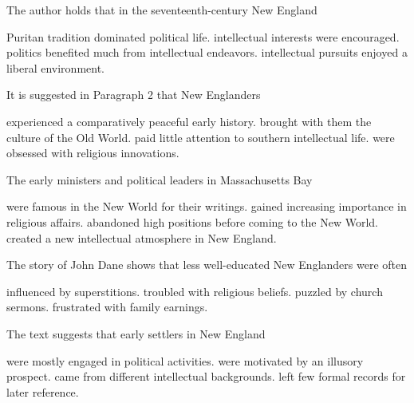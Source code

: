 \item The author holds that in the seventeenth-century New England
\begin{tasks}
	\task Puritan tradition dominated political life.
	\task intellectual interests were encouraged.
	\task politics benefited much from intellectual endeavors.
	\task intellectual pursuits enjoyed a liberal environment.
\end{tasks}
\item It is suggested in Paragraph 2 that New Englanders
\begin{tasks}
	\task experienced a comparatively peaceful early history.
	\task brought with them the culture of the Old World.
	\task paid little attention to southern intellectual life.
	\task were obsessed with religious innovations.
\end{tasks}
\item The early ministers and political leaders in Massachusetts Bay
\begin{tasks}
	\task were famous in the New World for their writings.
	\task gained increasing importance in religious affairs.
	\task abandoned high positions before coming to the New World.
	\task created a new intellectual atmosphere in New England.
\end{tasks}
\item The story of John Dane shows that less well-educated New Englanders were  often
\begin{tasks}
	\task influenced by superstitions.
	\task troubled with religious beliefs.
	\task puzzled by church sermons.
	\task frustrated with family earnings.
\end{tasks}
\item The text suggests that early settlers in New England
\begin{tasks}
	\task were mostly engaged in political activities.
	\task were motivated by an illusory prospect.
	\task came from different intellectual backgrounds.
	\task left few formal records for later reference.
\end{tasks}